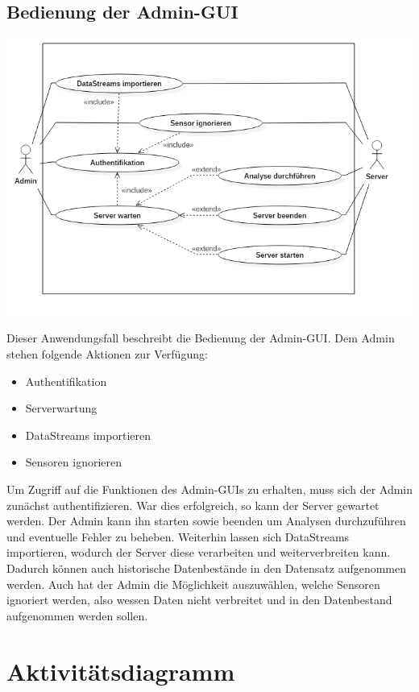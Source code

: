     \subsection{Bedienung der Admin-GUI}
        \includegraphics[width=1\linewidth]{diagrams/UseCaseDiagram2.png}
        
        Dieser Anwendungsfall beschreibt die Bedienung der Admin-GUI. Dem Admin stehen folgende Aktionen zur Verfügung:
        \begin{itemize}
            \item Authentifikation
            \item Serverwartung
            \item DataStreams importieren
            \item Sensoren ignorieren
        \end{itemize}
        Um Zugriff auf die Funktionen des Admin-GUIs zu erhalten, muss sich der Admin zunächst authentifizieren. War dies erfolgreich, so 
        kann der Server gewartet werden. Der Admin kann ihn starten sowie beenden um Analysen durchzuführen und eventuelle 
        Fehler zu beheben. Weiterhin lassen sich DataStreams importieren, wodurch der Server diese verarbeiten und weiterverbreiten 
        kann. Dadurch können auch historische Datenbestände in den Datensatz aufgenommen werden. Auch hat der Admin die 
        Möglichkeit auszuwählen, welche Sensoren ignoriert werden, also wessen Daten nicht verbreitet und in den Datenbestand 
        aufgenommen werden sollen.
        
\section{Aktivitätsdiagramm}
